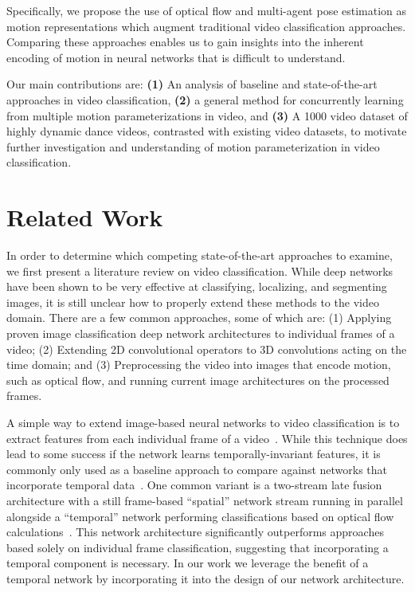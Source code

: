 \documentclass[10pt,twocolumn,letterpaper]{article}
\begin{document}
Specifically, we propose the use of optical flow and multi-agent pose estimation as motion representations which augment traditional video classification approaches. Comparing these approaches enables us to gain insights into the inherent encoding of motion in neural networks that is difficult to understand.

Our main contributions are: \textbf{(1)} An analysis of baseline and state-of-the-art approaches in video classification, \textbf{(2)} a general method for concurrently learning from multiple motion parameterizations in video, and \textbf{(3)} A 1000 video dataset of highly dynamic dance videos, contrasted with existing video datasets, to motivate further investigation and understanding of motion parameterization in video classification.
% 

\section{\label{sec:related}Related Work}

In order to determine which competing state-of-the-art approaches to examine, we first present a literature review on video classification. While deep networks have been shown to be very effective at classifying, localizing, and segmenting images, it is still unclear how to properly extend these methods to the video domain. There are a few common approaches, some of which are: (1) Applying proven image classification deep network architectures to individual frames of a video; (2) Extending 2D convolutional operators to 3D convolutions acting on the time domain;  and (3) Preprocessing the video into images that encode motion, such as optical flow, and running current image architectures on the processed frames.

A simple way to extend image-based neural networks to video classification is to extract features from each individual frame of a video~\cite{NIPS2012_4730}. While this technique does lead to some success if the network learns temporally-invariant features, it is commonly only used as a baseline approach to compare against networks that incorporate temporal data~\cite{6165309,Karpathy_2014_CVPR}. One common variant is a two-stream late fusion architecture with a still frame-based ``spatial'' network stream running in parallel alongside a ``temporal'' network performing classifications based on optical flow calculations~\cite{cheron2015p,feichtenhofer2016convolutional,gkioxari2015finding,NIPS2014_5353}. This network architecture significantly outperforms approaches based solely on individual frame classification, suggesting that incorporating a temporal component is necessary. In our work we leverage the benefit of a temporal network by incorporating it into the design of our network architecture.
\end{document}
